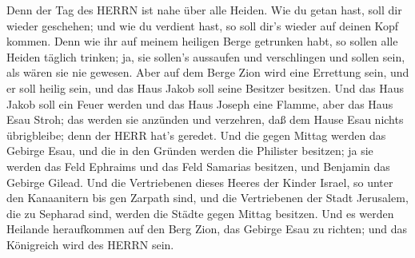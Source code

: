Denn der Tag des HERRN ist nahe über alle Heiden. Wie du getan hast,
soll dir wieder geschehen; und wie du verdient hast, so soll dir's
wieder auf deinen Kopf kommen.  Denn wie ihr auf meinem
heiligen Berge getrunken habt, so sollen alle Heiden täglich trinken;
ja, sie sollen's aussaufen und verschlingen und sollen sein, als wären
sie nie gewesen.  Aber auf dem Berge Zion wird eine
Errettung sein, und er soll heilig sein, und das Haus Jakob soll seine
Besitzer besitzen.  Und das Haus Jakob soll ein Feuer
werden und das Haus Joseph eine Flamme, aber das Haus Esau Stroh; das
werden sie anzünden und verzehren, daß dem Hause Esau nichts
übrigbleibe; denn der HERR hat's geredet.  Und die gegen
Mittag werden das Gebirge Esau, und die in den Gründen werden die
Philister besitzen; ja sie werden das Feld Ephraims und das Feld
Samarias besitzen, und Benjamin das Gebirge Gilead.  Und
die Vertriebenen dieses Heeres der Kinder Israel, so unter den
Kanaanitern bis gen Zarpath sind, und die Vertriebenen der Stadt
Jerusalem, die zu Sepharad sind, werden die Städte gegen Mittag
besitzen.  Und es werden Heilande heraufkommen auf den Berg
Zion, das Gebirge Esau zu richten; und das Königreich wird des HERRN
sein.
